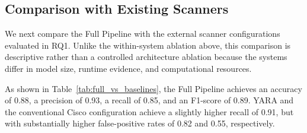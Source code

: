 






\subsection{Comparison with Existing Scanners}
\label{sec:rq2-baseline-comparison}

We next compare the Full Pipeline with the external scanner
configurations evaluated in RQ1. Unlike the within-system ablation
above, this comparison is descriptive rather than a controlled
architecture ablation because the systems differ in model size,
runtime evidence, and computational resources.

As shown in Table~\ref{tab:full_vs_baselines}, the Full Pipeline
achieves an accuracy of 0.88, a precision of 0.93, a recall of 0.85,
and an F1-score of 0.89. YARA and the conventional Cisco
configuration achieve a slightly higher recall of 0.91, but with
substantially higher false-positive rates of 0.82 and 0.55,
respectively.

